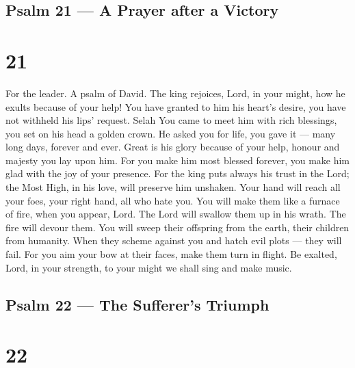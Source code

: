 \hypertarget{psalm-21-a-prayer-after-a-victory}{%
\subsection{Psalm 21 --- A Prayer after a
Victory}\label{psalm-21-a-prayer-after-a-victory}}

\hypertarget{section-20}{%
\section{21}\label{section-20}}

For the leader. A psalm of David.  The king rejoices, Lord,
in your might, how he exults because of your help!  You have
granted to him his heart's desire, you have not withheld his lips'
request. Selah  You came to meet him with rich blessings,
you set on his head a golden crown.  He asked you for life,
you gave it --- many long days, forever and ever.  Great is
his glory because of your help, honour and majesty you lay upon him.
 For you make him most blessed forever, you make him glad
with the joy of your presence.  For the king puts always his
trust in the Lord; the Most High, in his love, will preserve him
unshaken.  Your hand will reach all your foes, your right
hand, all who hate you.  You will make them like a furnace
of fire, when you appear, Lord. The Lord will swallow them up in his
wrath. The fire will devour them.  You will sweep their
offspring from the earth, their children from humanity. 
When they scheme against you and hatch evil plots --- they will fail.
 For you aim your bow at their faces, make them turn in
flight.  Be exalted, Lord, in your strength, to your might
we shall sing and make music.

\hypertarget{psalm-22-the-sufferers-triumph}{%
\subsection{Psalm 22 --- The Sufferer's
Triumph}\label{psalm-22-the-sufferers-triumph}}

\hypertarget{section-21}{%
\section{22}\label{section-21}}

